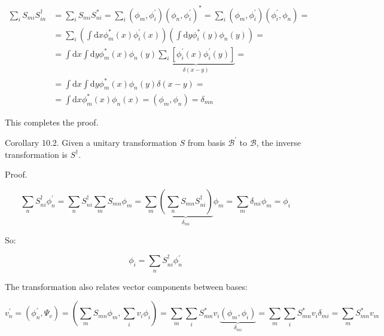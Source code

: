\documentclass[italian]{HKNdocument}
\begin{document}
\begin{align}
\sum_{i} S_{m i} S_{i n}^{\dagger} & =\sum_{i} S_{m i} S_{n i}^{*}=\sum_{i}\left(\phi_{m}, \phi_{i}^{\prime}\right)\left(\phi_{n}, \phi_{i}^{\prime}\right)^{*}=\sum_{i}\left(\phi_{m}, \phi_{i}^{\prime}\right)\left(\phi_{i}^{\prime}, \phi_{n}\right)= \\
& =\sum_{i}\left(\int \mathrm{d} x \phi_{m}^{*}(x) \phi_{i}^{\prime}(x)\right)\left(\int \mathrm{d} y \phi_{i}^{*}(y) \phi_{n}(y)\right)= \\
& =\int \mathrm{d} x \int \mathrm{d} y \phi_{m}^{*}(x) \phi_{n}(y) \underbrace{\sum_{i}\left[\phi_{i}^{\prime}(x) \phi_{i}^{\prime}(y)\right]}_{\delta(x-y)}= \\
& =\int \mathrm{d} x \int \mathrm{d} y \phi_{m}^{*}(x) \phi_{n}(y) \delta(x-y)= \\
& =\int \mathrm{d} x \phi_{m}^{*}(x) \phi_{n}(x)=\left(\phi_{m}, \phi_{n}\right)=\delta_{m n} \label{eq:10.14}
\end{align}

This completes the proof.

Corollary 10.2. Given a unitary transformation $S$ from basis $\mathcal{B}^{\prime}$ to $\mathcal{B}$, the inverse transformation is $S^{\dagger}$.

Proof.

\begin{equation}
\sum_{n} S_{n i}^{\dagger} \phi_{n}^{\prime}=\sum_{n} S_{n i}^{\dagger} \sum_{m} S_{m n} \phi_{m}=\sum_{m} \underbrace{\left(\sum_{n} S_{m n} S_{n i}^{\dagger}\right)}_{\delta_{m i}} \phi_{m}=\sum_{m} \delta_{m i} \phi_{m}=\phi_{i} \label{eq:10.15}
\end{equation}


So:

\begin{equation}
\phi_{i}=\sum_{n} S_{n i}^{\dagger} \phi_{n}^{\prime} \label{eq:10.16}
\end{equation}

The transformation also relates vector components between bases:

\begin{equation}
v_{n}^{\prime}=\left(\phi_{n}^{\prime}, \Psi_{v}\right)=\left(\sum_{m} S_{m n} \phi_{m}, \sum_{i} v_{i} \phi_{i}\right)=\sum_{m} \sum_{i} S_{m n}^{*} v_{i} \underbrace{\left(\phi_{m}, \phi_{i}\right)}_{\delta_{m i}}=\sum_{m} \sum_{i} S_{m n}^{*} v_{i} \delta_{m i}=\sum_{m} S_{m n}^{*} v_{m} \label{eq:10.17}
\end{equation}
\end{document}
